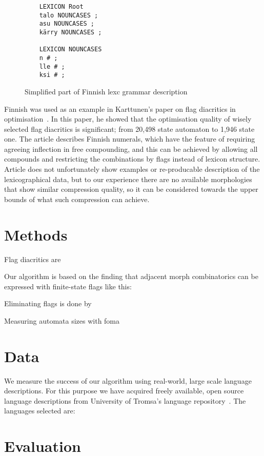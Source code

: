 \documentclass[11pt]{article}
\begin{document}
\begin{figure}
    \centering
    \begin{verbatim}
    LEXICON Root
    talo NOUNCASES ;
    asu NOUNCASES ;
    kärry NOUNCASES ;

    LEXICON NOUNCASES
    n # ;
    lle # ;
    ksi # ;
    \end{verbatim}
    \caption{Simplified part of Finnish lexc grammar description
    \label{fig:lexc-fin}}
\end{figure}

Finnish was used as an example in Karttunen's paper on flag diacritics in
optimisation~. In this paper, he showed that
the optimisation quality of wisely selected flag diacritics is significant;
from 20,498 state automaton to 1,946 state one. The article describes Finnish
numerals, which have the feature of requiring agreeing inflection in free
compounding, and this can be achieved by allowing all compounds and restricting
the combinations by flags instead of lexicon structure. Article does not
unfortunately show examples or re-producable description of the lexicographical
data, but to our experience there are no available morphologies that show
similar compression quality, so it can be considered towards the upper bounds
of what such compression can achieve.
 

\section{Methods}
\label{sec:methods}

Flag diacritics are

Our algorithm is based on the finding that adjacent morph combinatorics can
be expressed with finite-state flags like this:

Eliminating flags is done by

Measuring automata sizes with foma


\section{Data}
\label{sec:data}

We measure the success of our algorithm using real-world, large scale language
descriptions. For this purpose we have acquired freely available, open source
language descriptions from University of Tromsa's language 
repository~\cite{moshagen2013building}. The languages selected are:

\section{Evaluation}
\label{sec:evaluation}
\end{document}
